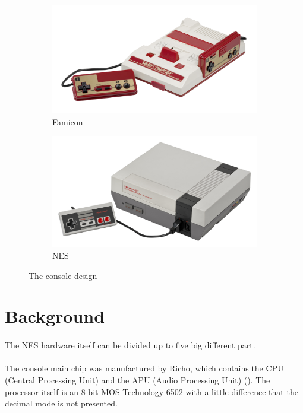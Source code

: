 \documentclass[]{report}
\begin{document}
\begin{figure}[!htb]
	\centering
	\begin{subfigure}[b]{0.4\textwidth}
		\includegraphics[width=\textwidth]{images/famicon.jpg}
		\caption{Famicon}
		\label{fig:1}
	\end{subfigure}
	\begin{subfigure}[b]{0.4\textwidth}
		\includegraphics[width=\textwidth]{images/nes.jpg}
		\caption{NES}
		\label{fig:2}
	\end{subfigure}
	\caption{\label{fig:my-label} The console design}
\end{figure}
\clearpage



\section{Background}
\paragraph{ }
The NES hardware itself can be divided up to five big different part. 
\paragraph{ }
The console main chip was manufactured by Richo, which contains the CPU (Central Processing Unit) and the APU (Audio Processing Unit) (\cite{CPU}).  
The processor itself is an 8-bit MOS Technology 6502 with a little difference that the decimal mode is not presented. 
\end{document}
